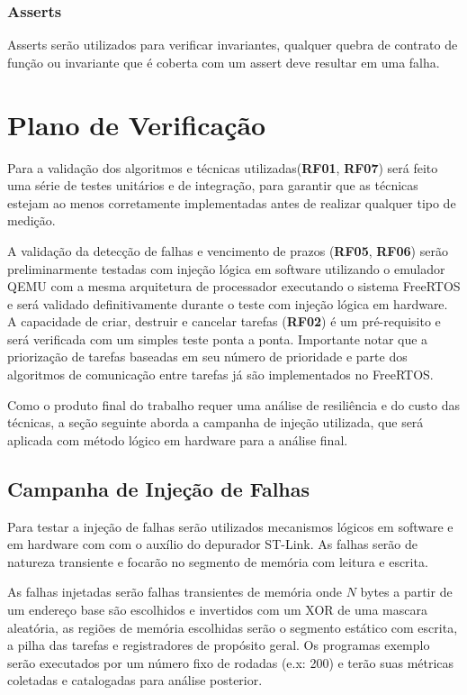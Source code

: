 \subsubsection{Asserts}

Asserts serão utilizados para verificar invariantes, qualquer quebra de contrato de função ou invariante que é coberta com um assert deve resultar em uma falha.

\section{Plano de Verificação}

Para a validação dos algoritmos e técnicas utilizadas(\textbf{RF01}, \textbf{RF07}) será feito uma série de testes unitários e de integração, para garantir que as técnicas estejam ao menos corretamente implementadas antes de realizar qualquer tipo de medição.

A validação da detecção de falhas e vencimento de prazos (\textbf{RF05}, \textbf{RF06}) serão preliminarmente testadas com injeção lógica em software utilizando o emulador QEMU com a mesma arquitetura de processador executando o sistema FreeRTOS e será validado definitivamente durante o teste com injeção lógica em hardware. A capacidade de criar, destruir e cancelar tarefas (\textbf{RF02}) é um pré-requisito e será verificada com um simples teste ponta a ponta. Importante notar que a priorização de tarefas baseadas em seu número de prioridade e parte dos algoritmos de comunicação entre tarefas já são implementados no FreeRTOS.

Como o produto final do trabalho requer uma análise de resiliência e do custo das técnicas, a seção seguinte aborda a campanha de injeção utilizada, que será aplicada com método lógico em hardware para a análise final.

\subsection{Campanha de Injeção de Falhas} \label{subsec:campanhaInjecao}

Para testar a injeção de falhas serão utilizados mecanismos lógicos em software e em hardware com com o auxílio do depurador ST-Link. As falhas serão de natureza transiente e focarão no segmento de memória com leitura e escrita.

As falhas injetadas serão falhas transientes de memória onde $N$ bytes a partir de um endereço base são escolhidos e invertidos com um XOR de uma mascara aleatória, as regiões de memória escolhidas serão o segmento estático com escrita, a pilha das tarefas e registradores de propósito geral. Os programas exemplo serão executados por um número fixo de rodadas (e.x: 200) e terão suas métricas coletadas e catalogadas para análise posterior.

